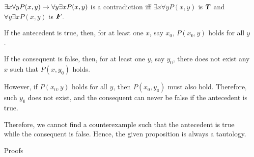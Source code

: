 \documentclass[answers]{exam}
\begin{document}
\begin{questions}
\begin{parts}
\begin{solution}
            $\exists x \forall y P(x,y) \rightarrow \forall y \exists x P(x,y)$ is a contradiction
            iff $\exists x \forall y P(x,y)$ is $\bm{T}$ and $\forall y \exists x P(x,y)$ is
            $\bm{F}$.

            If the antecedent is true, then, for at least one $x$, say $x_0$, $P(x_0, y)$
            holds for all $y$.

            If the consequent is false, then, for at least one $y$, say $y_0$, there does not
            exist any $x$ such that $P(x, y_0)$ holds.

            However, if $P(x_0, y)$ holds for all $y$, then $P(x_0, y_0)$ must also hold.
            Therefore, such $y_0$ does not exist, and the consequent can never be false if
            the antecedent is true.

            Therefore, we cannot find a counterexample such that the antecedent is true
            while the consequent is false. Hence, the given proposition is always a tautology.
        \end{solution}

    \end{parts}

    \question Proofs

\end{questions}
\end{document}
